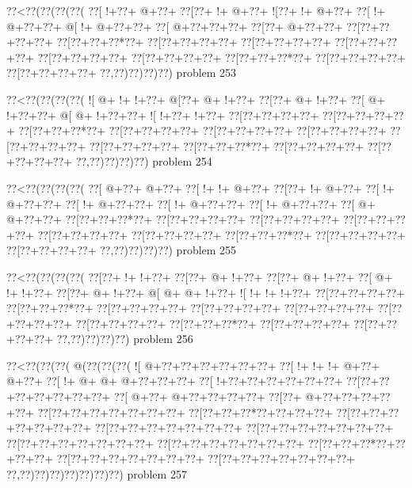 \vbox{\vbox{\goo
\0??<\0??(\0??(\0??(\0??(
\0??[\- !+\0??+\- @+\0??+
\0??[\0??+\- !+\- @+\0??+
\- ![\0??+\- !+\- @+\0??+
\0??[\- !+\- @+\0??+\0??+
\- @[\- !+\- @+\0??+\0??+
\0??[\- @+\0??+\0??+\0??+
\0??[\0??+\- @+\0??+\0??+
\0??[\0??+\0??+\0??+\0??+
\0??[\0??+\0??+\0??*\0??+
\0??[\0??+\0??+\0??+\0??+
\0??[\0??+\0??+\0??+\0??+
\0??[\0??+\0??+\0??+\0??+
\0??[\0??+\0??+\0??+\0??+
\0??[\0??+\0??+\0??+\0??+
\0??[\0??+\0??+\0??*\0??+
\0??[\0??+\0??+\0??+\0??+
\0??[\0??+\0??+\0??+\0??+
\0??,\0??)\0??)\0??)\0??)
}
\hfil problem 253\hfil\break
}

\vbox{\vbox{\goo
\0??<\0??(\0??(\0??(\0??(
\- ![\- @+\- !+\- !+\0??+
\- @[\0??+\- @+\- !+\0??+
\0??[\0??+\- @+\- !+\0??+
\0??[\- @+\- !+\0??+\0??+
\- @[\- @+\- !+\0??+\0??+
\- ![\- !+\0??+\- !+\0??+
\0??[\0??+\0??+\0??+\0??+
\0??[\0??+\0??+\0??+\0??+
\0??[\0??+\0??+\0??*\0??+
\0??[\0??+\0??+\0??+\0??+
\0??[\0??+\0??+\0??+\0??+
\0??[\0??+\0??+\0??+\0??+
\0??[\0??+\0??+\0??+\0??+
\0??[\0??+\0??+\0??+\0??+
\0??[\0??+\0??+\0??*\0??+
\0??[\0??+\0??+\0??+\0??+
\0??[\0??+\0??+\0??+\0??+
\0??,\0??)\0??)\0??)\0??)
}
\hfil problem 254\hfil\break
}

\vbox{\vbox{\goo
\0??<\0??(\0??(\0??(\0??(
\0??[\- @+\0??+\- @+\0??+
\0??[\- !+\- !+\- @+\0??+
\0??[\0??+\- !+\- @+\0??+
\0??[\- !+\- @+\0??+\0??+
\0??[\- !+\- @+\0??+\0??+
\0??[\- !+\- @+\0??+\0??+
\0??[\- !+\- @+\0??+\0??+
\0??[\- @+\- @+\0??+\0??+
\0??[\0??+\0??+\0??*\0??+
\0??[\0??+\0??+\0??+\0??+
\0??[\0??+\0??+\0??+\0??+
\0??[\0??+\0??+\0??+\0??+
\0??[\0??+\0??+\0??+\0??+
\0??[\0??+\0??+\0??+\0??+
\0??[\0??+\0??+\0??*\0??+
\0??[\0??+\0??+\0??+\0??+
\0??[\0??+\0??+\0??+\0??+
\0??,\0??)\0??)\0??)\0??)
}
\hfil problem 255\hfil\break
}

\vbox{\vbox{\goo
\0??<\0??(\0??(\0??(\0??(
\0??[\0??+\- !+\- !+\0??+
\0??[\0??+\- @+\- !+\0??+
\0??[\0??+\- @+\- !+\0??+
\0??[\- @+\- !+\- !+\0??+
\0??[\0??+\- @+\- !+\0??+
\- @[\- @+\- @+\- !+\0??+
\- ![\- !+\- !+\- !+\0??+
\0??[\0??+\0??+\0??+\0??+
\0??[\0??+\0??+\0??*\0??+
\0??[\0??+\0??+\0??+\0??+
\0??[\0??+\0??+\0??+\0??+
\0??[\0??+\0??+\0??+\0??+
\0??[\0??+\0??+\0??+\0??+
\0??[\0??+\0??+\0??+\0??+
\0??[\0??+\0??+\0??*\0??+
\0??[\0??+\0??+\0??+\0??+
\0??[\0??+\0??+\0??+\0??+
\0??,\0??)\0??)\0??)\0??)
}
\hfil problem 256\hfil\break
}

\vbox{\vbox{\goo
\0??<\0??(\0??(\0??(\- @(\0??(\0??(\0??(
\- ![\- @+\0??+\0??+\0??+\0??+\0??+\0??+
\0??[\- !+\- !+\- !+\- @+\0??+\- @+\0??+
\0??[\- !+\- @+\- @+\- @+\0??+\0??+\0??+
\0??[\- !+\0??+\0??+\0??+\0??+\0??+\0??+
\0??[\0??+\0??+\0??+\0??+\0??+\0??+\0??+
\0??[\- @+\0??+\- @+\0??+\0??+\0??+\0??+
\0??[\0??+\- @+\0??+\0??+\0??+\0??+\0??+
\0??[\0??+\0??+\0??+\0??+\0??+\0??+\0??+
\0??[\0??+\0??+\0??*\0??+\0??+\0??+\0??+
\0??[\0??+\0??+\0??+\0??+\0??+\0??+\0??+
\0??[\0??+\0??+\0??+\0??+\0??+\0??+\0??+
\0??[\0??+\0??+\0??+\0??+\0??+\0??+\0??+
\0??[\0??+\0??+\0??+\0??+\0??+\0??+\0??+
\0??[\0??+\0??+\0??+\0??+\0??+\0??+\0??+
\0??[\0??+\0??+\0??*\0??+\0??+\0??+\0??+
\0??[\0??+\0??+\0??+\0??+\0??+\0??+\0??+
\0??[\0??+\0??+\0??+\0??+\0??+\0??+\0??+
\0??,\0??)\0??)\0??)\0??)\0??)\0??)\0??)
}
\hfil problem 257\hfil\break
}


